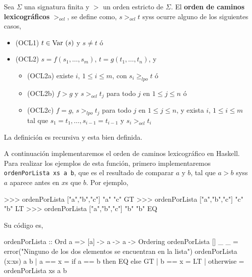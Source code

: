 \begin{defi}
  Sea $\Sigma$ una signatura finita y $>$ un orden estricto de
  $\Sigma$. El \textbf{orden de caminos lexicográficos} $>_{ocl}$, se define
  como, $s>_{ocl}t$ syss ocurre alguno de los siguientes casos,
  \begin{itemize}
  \item (OCL1) $t \in \mbox{Var }(s)$ y $s \not = t$ ó
  \item (OCL2) $s = f(s_1, \dots, s_m)$, $t = g(t_1, \dots, t_n)$, y
    \begin{itemize}
    \item (OCL2a) existe $i$, $1 \leq i \leq m$, con
      $s_i \geq_{lpo} t$ ó
    \item (OCL2b) $f > g$ y $s >_{ocl} t_j$ para todo $j$ en
      $1 \leq j \leq n$ ó
    \item (OCL2c) $f = g$, $s >_{lpo} t_j$ para todo $j$ en
      $1 \leq j \leq n$, y exista $i$, $1 \leq i \leq m$ tal que
      $s_1 = t_1, \dots, s_{i-1} = t_{i-1}$ y $s_i >_{ocl} t_i$
    \end{itemize}
  \end{itemize}
\end{defi}

La definición es recursiva y esta bien definida.




A continuación implementaremos el orden de caminos lexicográfico en
Haskell. Para realizar los ejemplos de esta función, primero
implementaremos \newline \texttt{ordenPorLista xs a b}, que es el resultado de
comparar $a$ y $b$, tal que $a > b$ syss $a$ aparece antes en $x$s que
$b$. Por ejemplo,

\begin{sesion}
>>> ordenPorLista ["a","b","c"] "a" "c"
GT
>>> ordenPorLista ["a","b","c"] "c" "b"
LT
>>> ordenPorLista ["a","b","c"] "b" "b"
EQ
\end{sesion}

Su código es,

\begin{codigo}
ordenPorLista :: Ord a => [a] -> a  -> a -> Ordering
ordenPorLista [] _ _ =
  error("Ninguno de los dos elementos se encuentran
         en la lista")
ordenPorLista (x:xs) a b
  | a == x = if a == b
             then EQ
             else GT
  | b == x = LT
  | otherwise = ordenPorLista xs a b
\end{codigo}

